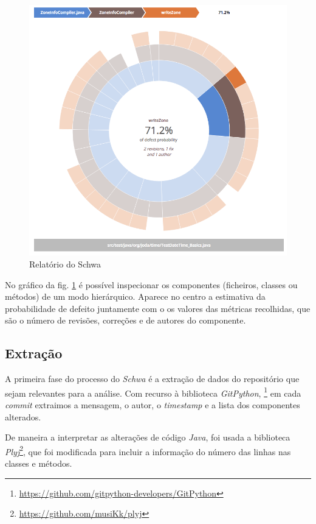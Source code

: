 \documentclass[9pt,a4paper]{extarticle}
\begin{document}
\begin{multicols}{2}
\begin{figure}[H]
\centerline{\includegraphics[scale=.25]{sunburst.png}}
\caption{Relatório do Schwa}
\label{fig:sunburst}
\end{figure}

No gráfico da fig. \ref{fig:sunburst} é possível inspecionar os componentes
(ficheiros, classes ou métodos) de um modo hierárquico. Aparece no centro a
estimativa da probabilidade de defeito juntamente com o os valores das métricas
recolhidas, que são o número de revisões, correções e de autores do componente.

\subsection{Extração}
A primeira fase do processo do \emph{Schwa} é a extração de dados do repositório que
sejam relevantes para a análise. Com recurso à biblioteca \emph{GitPython},
\footnote{\url{https://github.com/gitpython-developers/GitPython}}
em cada \emph{commit} extraimos a mensagem, o autor, o \emph{timestamp} e a lista dos
componentes alterados.

De maneira a interpretar as alterações de código \emph{Java}, foi usada a biblioteca
\emph{Plyj}\footnote{\url{https://github.com/musiKk/plyj}}, que foi modificada
para incluir a informação do número das linhas nas classes e métodos.


\end{multicols}
\end{document}

